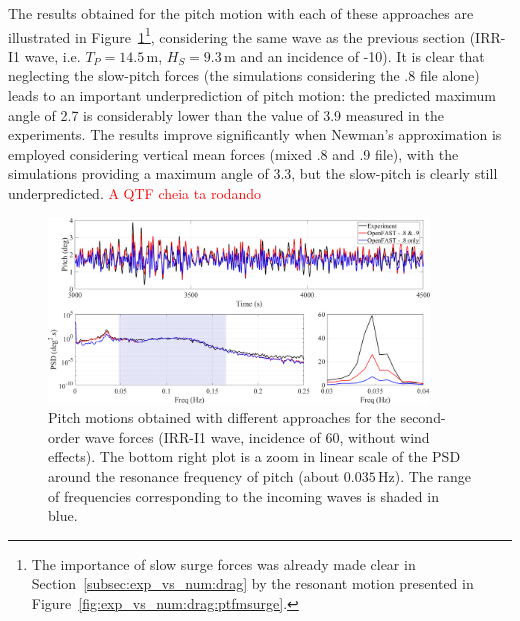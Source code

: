 The results obtained for the pitch motion with each of these approaches are illustrated in Figure~\ref{fig:exp_vs_num:2ndOrder:ptfmpitch}\footnote{The importance of slow surge forces was already made clear in Section~\ref{subsec:exp_vs_num:drag} by the resonant motion presented in Figure~\ref{fig:exp_vs_num:drag:ptfmsurge}.}, considering the same wave as the previous section (IRR-I1 wave, i.e. $T_P=14.5\,\text{m}$, $H_S=9.3\,\text{m}$ and an incidence of -10\textdegree{}). It is clear that neglecting the slow-pitch forces (the simulations considering the .8 file alone) leads to an important underprediction of pitch motion: the predicted maximum angle of 2.7\textdegree{} is considerably lower than the value of 3.9\textdegree{} measured in the experiments. The results improve significantly when Newman's approximation is employed considering vertical mean forces (mixed .8 and .9 file), with the simulations providing a maximum angle of 3.3\textdegree{}, but the slow-pitch is clearly still underpredicted. \textcolor{red}{A QTF cheia ta rodando}
\begin{figure}[!hbtp]
	\centering
	\includegraphics[width=0.9\textwidth]{./figures/ptfmpitch-2nd_order.png}	
	\caption{Pitch motions obtained with different approaches for the second-order wave forces (IRR-I1 wave, incidence of 60\textdegree{}, without wind effects). The bottom right plot is a zoom in linear scale of the PSD around the resonance frequency of pitch (about $0.035\,\text{Hz}$). The range of frequencies corresponding to the incoming waves is shaded in blue.} \label{fig:exp_vs_num:2ndOrder:ptfmpitch}%
\end{figure}%









